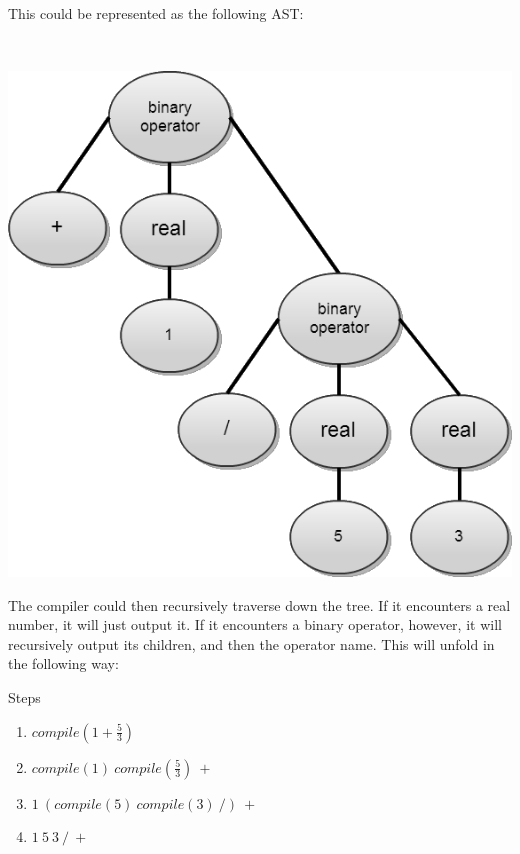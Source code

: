 \documentclass[titlepage]{article}
\begin{document}
			This could be represented as the following AST:
			\newline

			~\centerline{\includegraphics[scale=.5]{ExampleCompileBinaryAST.png}}
			\newline

			The compiler could then recursively traverse down the tree.  If it encounters a real number, it will just output it.  If it encounters a binary operator, however, it will recursively output its children, and then the operator name.  This will unfold in the following way:
			\newline

			Steps
			\begin{enumerate}
				\itemsep0em
				\item $compile(1 + \frac{5}{3})$
				\item $compile(1)\ compile(\frac{5}{3})\ +$
				\item $1\ (compile(5)\ compile(3)\ /)\ +$
				\item $1\ 5\ 3\ /\ +$
				\newline
			\end{enumerate}
\end{document}

